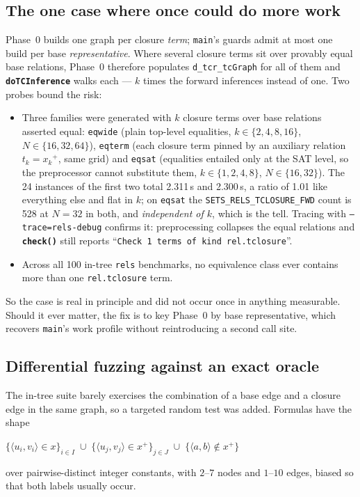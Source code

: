 \documentclass[11pt,a4paper]{article}
\newcommand{\code}[1]{\texttt{\small #1}}
\newcommand{\fn}[1]{\texttt{\small\bfseries #1}}
\newcommand{\file}[1]{\texttt{\small #1}}
\newcommand{\tup}[1]{\langle #1 \rangle}
\newcommand{\tc}[1]{{#1}^{+}}
\theoremstyle{definition}
\begin{document}
\subsection{The one case where once could do more work}

Phase~0 builds one graph per closure \emph{term}; \code{main}'s guards admit at
most one build per base \emph{representative}. Where several closure terms sit
over provably equal base relations, Phase~0 therefore populates
\code{d\_tcr\_tcGraph} for all of them and \fn{doTCInference} walks each --- $k$
times the forward inferences instead of one. Two probes bound the risk:

\begin{itemize}[leftmargin=*,itemsep=2pt]
\item Three families were generated with $k$ closure terms over base relations
  asserted equal: \code{eqwide} (plain top-level equalities, $k \in
  \{2,4,8,16\}$, $N \in \{16,32,64\}$), \code{eqterm} (each closure term pinned
  by an auxiliary relation $t_k = \tc{x_k}$, same grid) and \code{eqsat}
  (equalities entailed only at the SAT level, so the preprocessor cannot
  substitute them, $k \in \{1,2,4,8\}$, $N \in \{16,32\}$). The 24 instances of
  the first two total 2.311\,s and 2.300\,s, a ratio of 1.01 like everything
  else and flat in $k$; on \code{eqsat} the
  \code{SETS\_RELS\_TCLOSURE\_FWD} count is 528 at $N=32$ in both, and
  \emph{independent of $k$}, which is the tell. Tracing with
  \code{--trace=rels-debug} confirms it: preprocessing collapses the equal
  relations and \fn{check()} still reports ``\code{Check 1 terms of kind
  rel.tclosure}''.
\item Across all 100 in-tree \file{rels} benchmarks, no equivalence class ever
  contains more than one \code{rel.tclosure} term.
\end{itemize}

\noindent
So the case is real in principle and did not occur once in anything measurable.
Should it ever matter, the fix is to key Phase~0 by base representative, which
recovers \code{main}'s work profile without reintroducing a second call site.

\subsection{Differential fuzzing against an exact oracle}

The in-tree suite barely exercises the combination of a base edge and a closure
edge in the same graph, so a targeted random test was added. Formulas have the
shape
\begin{center}\small
$\{\tup{u_i,v_i}\in x\}_{i\in I}\;\cup\;\{\tup{u_j,v_j}\in\tc{x}\}_{j\in J}
 \;\cup\; \{\tup{a,b}\notin\tc{x}\}$
\end{center}
over pairwise-distinct integer constants, with $2$--$7$ nodes and $1$--$10$
edges, biased so that both labels usually occur.
\end{document}
